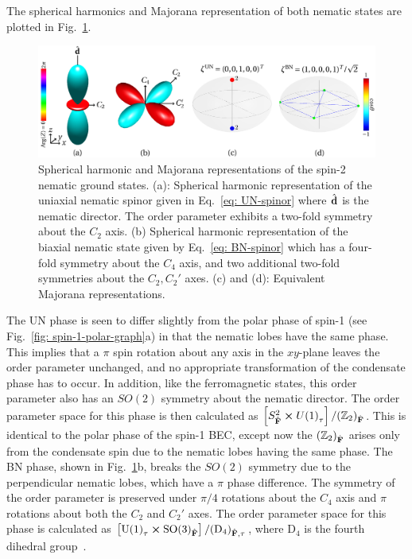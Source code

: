 The spherical harmonics and Majorana representation of both nematic states are
plotted in Fig.~\ref{fig: nematic-graph}.
\begin{figure}
    \centering
    \includegraphics[width=\textwidth]
    {gfx/ch-groundStateSymmetries/spin-2-nematic.pdf}
    \caption[Spherical harmonic and Majorana representations of the spin-2
    nematic ground states]{\label{fig: nematic-graph}Spherical harmonic and
    Majorana representations of the spin-2 nematic ground states.
    (a): Spherical harmonic representation of the uniaxial nematic spinor given
    in Eq.~\eqref{eq: UN-spinor} where \(\hat{\vb{d}}\) is the nematic director.
    The order parameter exhibits a two-fold symmetry about the \(C_2\) axis.
    (b) Spherical harmonic representation of the biaxial nematic state given by
    Eq.~\eqref{eq: BN-spinor} which has a four-fold symmetry about the \(C_4\)
    axis, and two additional two-fold symmetries about the \(C_2, C_2'\) axes.
    (c) and (d): Equivalent Majorana representations.}
\end{figure}
The UN phase is seen to differ slightly from the polar phase of spin-1 (see
Fig.~\ref{fig: spin-1-polar-graph}a) in that the nematic lobes have the
same phase.
This implies that a \(\pi \) spin rotation about any axis in the \(xy\)-plane
leaves the order parameter unchanged, and no appropriate transformation of the
condensate phase has to occur.
In addition, like the ferromagnetic states, this order parameter also has an
\(SO(2)\) symmetry about the nematic director.
The order parameter space for this phase is then calculated as
\(\left[S^2_{\hat{\vb{F}}} \cross {U(1)}_\tau\right]
/ {({\mathbb{Z}}_2)}_{\hat{\vb{F}}} \).
This is identical to the polar phase of the spin-1 BEC, except now the
\({(\mathbb{Z}_2)}_{\hat{\vb{F}}}\) arises only from the condensate spin due to
the nematic lobes having the same phase.
The BN phase, shown in Fig.~\ref{fig: nematic-graph}b, breaks the
\(SO(2)\) symmetry due to the perpendicular nematic lobes, which have a \(\pi \)
phase difference.
The symmetry of the order parameter is preserved under \(\pi/4\) rotations
about the \(C_4\) axis and \(\pi\) rotations about both the \(C_2\) and \(C_2'\)
axes.
The order parameter space for this phase is calculated as
\(\left[{\text{U}(1)}_\tau \cross {\text{SO}(3)}_{\hat{\vb{F}}}\right]
/ {(\text{D}_4)}_{\hat{\vb{F}}, \tau}\), where \(\text{D}_4\) is the fourth
dihedral group~\cite{Kobayashi2012}.

